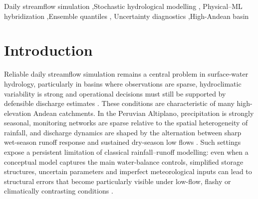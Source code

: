 \documentclass[a4paper,fleqn]{cas-sc}
\begin{document}
\begin{keywords}
Daily streamflow simulation \sep Stochastic hydrological modelling \sep
Physical--ML hybridization \sep Ensemble quantiles \sep
Uncertainty diagnostics \sep High-Andean basin
\end{keywords}

\maketitle

\section{Introduction}\label{sec:introduction}

Reliable daily streamflow simulation remains a central problem in
surface-water hydrology, particularly in basins where observations are
sparse, hydroclimatic variability is strong and operational decisions
must still be supported by defensible discharge estimates
\citep{razavi2013streamflow,guo2021regionalization}. These conditions
are characteristic of many high-elevation Andean catchments. In the
Peruvian Altiplano, precipitation is strongly seasonal, monitoring
networks are sparse relative to the spatial heterogeneity of rainfall,
and discharge dynamics are shaped by the alternation between sharp
wet-season runoff response and sustained dry-season low flows
\citep{condom2004transient,zubieta2018hydrological,lima2025modeling}.
Such settings expose a persistent limitation of classical
rainfall--runoff modelling: even when a conceptual model captures the
main water-balance controls, simplified storage structures, uncertain
parameters and imperfect meteorological inputs can lead to structural
errors that become particularly visible under low-flow, flashy or
climatically contrasting conditions
\citep{van2013influence,nauditt2017conceptual,ragettli2014evaluation}.
\end{document}
